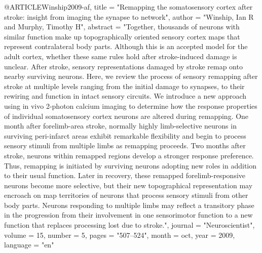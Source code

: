@ARTICLE{Winship2009-af,
	title    = "Remapping the somatosensory cortex after stroke: insight from
	imaging the synapse to network",
	author   = "Winship, Ian R and Murphy, Timothy H",
	abstract = "Together, thousands of neurons with similar function make up
	topographically oriented sensory cortex maps that represent
	contralateral body parts. Although this is an accepted model for
	the adult cortex, whether these same rules hold after
	stroke-induced damage is unclear. After stroke, sensory
	representations damaged by stroke remap onto nearby surviving
	neurons. Here, we review the process of sensory remapping after
	stroke at multiple levels ranging from the initial damage to
	synapses, to their rewiring and function in intact sensory
	circuits. We introduce a new approach using in vivo 2-photon
	calcium imaging to determine how the response properties of
	individual somatosensory cortex neurons are altered during
	remapping. One month after forelimb-area stroke, normally highly
	limb-selective neurons in surviving peri-infarct areas exhibit
	remarkable flexibility and begin to process sensory stimuli from
	multiple limbs as remapping proceeds. Two months after stroke,
	neurons within remapped regions develop a stronger response
	preference. Thus, remapping is initiated by surviving neurons
	adopting new roles in addition to their usual function. Later in
	recovery, these remapped forelimb-responsive neurons become more
	selective, but their new topographical representation may
	encroach on map territories of neurons that process sensory
	stimuli from other body parts. Neurons responding to multiple
	limbs may reflect a transitory phase in the progression from
	their involvement in one sensorimotor function to a new function
	that replaces processing lost due to stroke.",
	journal  = "Neuroscientist",
	volume   =  15,
	number   =  5,
	pages    = "507--524",
	month    =  oct,
	year     =  2009,
	language = "en"
}

